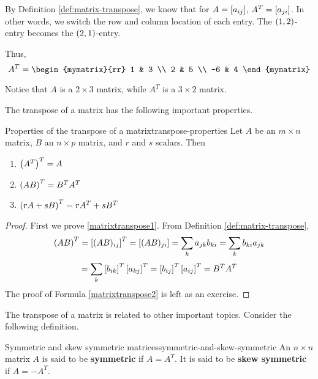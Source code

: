 \begin{solution}
By Definition \ref{def:matrix-transpose}, we know that for $A = \left[a_{ij} \right]$, 
$A^T = \left[a_{ji} \right]$. In other words, we switch the row and column
location of each entry. The $\left(1, 2 \right)$-entry becomes the $\left(2,1 \right)$-entry.

Thus, 
\begin{equation*}
A^T = 
 \begin{mymatrix}{rr}
1 & 3 \\
2 & 5 \\
-6 & 4
\end{mymatrix} 
\end{equation*}

Notice that $A$ is a $2 \times 3$ matrix, while $A^T$ is a $3 \times 2$ matrix. 
\end{solution}

The transpose of a matrix has the following important properties.

\begin{lemma}{Properties of the transpose of a matrix}{transpose-properties}
Let $A$ be an $m\times n$ matrix, $B$ an $n\times p$ matrix, and $r$ and $s$ scalars. Then
\begin{enumerate}
\item
$\left(A^{T}\right)^{T} = A$
\item
$\left(AB\right) ^{T}=B^{T}A^{T} $ \label{matrixtranspose1}
\item
$\left(rA+ sB\right) ^{T}=rA^{T}+ sB^{T}$  \label{matrixtranspose2}
\end{enumerate}
\end{lemma}

\begin{proof}
First we prove \ref{matrixtranspose1}. From Definition \ref{def:matrix-transpose},
\begin{equation*}
\left(AB\right)^{T} = \left[(AB) _{ij} \right] ^{T}=\left[(AB)_{ji} \right]=\sum_{k}a_{jk}b_{ki}= \sum_{k}b_{ki}a_{jk} 
\end{equation*}
\begin{equation*}
= \sum_{k}\left[b_{ik}\right]^{T}\left[
a_{kj}\right]^{T}=\left[b_{ij}\right] ^{T} \left[a_{ij}\right]^{T} = B^{T}A^{T} 
\end{equation*}
The proof of Formula \ref{matrixtranspose2} is left as an exercise. 
\end{proof}

The transpose of a matrix is related to other important topics. Consider the following definition.  

\begin{definition}{Symmetric and skew symmetric matrices}{symmetric-and-skew-symmetric}
An $n\times n$ matrix $A$ is said to be
\textbf{symmetric} if $A=A^{T}.$ It is said to be
\textbf{skew symmetric} if $A=-A^{T}.$
\end{definition}


